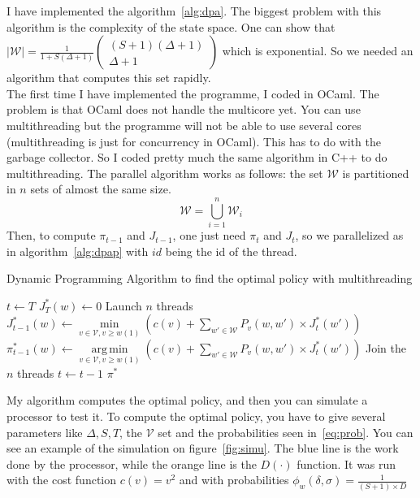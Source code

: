 \documentclass[
10pt, %
a4paper, %
oneside, %
headinclude,footinclude, %
BCOR5mm, %
]{scrartcl}
\DeclareMathOperator*{\argmin}{arg\,min}
\newcommand{\V}{\mathcal{V}}
\newcommand{\W}{\mathcal{W}}
\begin{document}
I have implemented the algorithm~\ref{alg:dpa}. The biggest problem
with this algorithm is the complexity of the state space. One can show
that $|\W|=\frac{1}{1+S(\Delta+1)}
    \left(
      \begin{matrix}
        (S+1)(\Delta+1) \\
        \Delta+1
      \end{matrix}
    \right)$
which is exponential. So we needed an algorithm
that computes this set rapidly.\\

The first time I have implemented the programme, I coded in OCaml. The
problem is that OCaml does not handle the multicore yet. You can
use multithreading but the programme will not be able to use several
cores (multithreading is just for concurrency in OCaml). This has
to do with the garbage collector. So I coded pretty much the same
algorithm in C++ to do multithreading. The parallel algorithm works as
follows: the set $\W$ is partitioned in $n$ sets of almost the same size.
\[
  \W=\bigcup_{i=1}^n \W_i
\]
Then, to compute $\pi_{t-1}$ and $J_{t-1}$, one just need $\pi_t$ and
$J_t$, so we parallelized as in algorithm~\ref{alg:dpap} with $id$
being the id of the thread.\\

\begin{algorithm}
  \caption{Dynamic Programming Algorithm to find the optimal policy
    with multithreading}
  \label{alg:dpap}
  \begin{algorithmic}
    \STATE $t\leftarrow T$
    \FORALL{$w\in\W$}
    \STATE $J_T^*(w)\leftarrow 0$
    \ENDFOR
    \STATE Launch $n$ threads
    \FORALL{$w\in\W_{id}$} 
    \STATE $J_{t-1}^*(w)\leftarrow
    \min\limits_{v\in\V,v\geq
      w(1)}\left(c(v)+\sum\limits_{w'\in\W}P_v(w,w')\times
      J_t^*(w')\right)$
    \STATE $\pi_{t-1}^*(w)\leftarrow
    \argmin\limits_{v\in\V,v\geq
      w(1)}\left(c(v)+\sum\limits_{w'\in\W}P_v(w,w')\times
      J_t^*(w')\right)$
    \ENDFOR
    \STATE Join the $n$ threads
    \STATE $t\leftarrow t-1$
    \ENDWHILE
    \RETURN $\pi^*$
  \end{algorithmic}
  
\end{algorithm}

My algorithm computes the optimal policy, and then you can simulate a
processor to test it. To compute the optimal policy,
you have to give several parameters like $\Delta, S,T$, the $\V$
set and the probabilities seen in~\ref{eq:prob}.
You can see an example of the simulation on
figure~\ref{fig:simu}. The blue line is the work done by the
processor, while the orange line is the $D(\cdot)$ function. It was
run with the cost function $c(v)=v^2$ and with probabilities
$\phi_w(\delta,\sigma)=\frac{1}{(S+1)\times D}$
\end{document}
